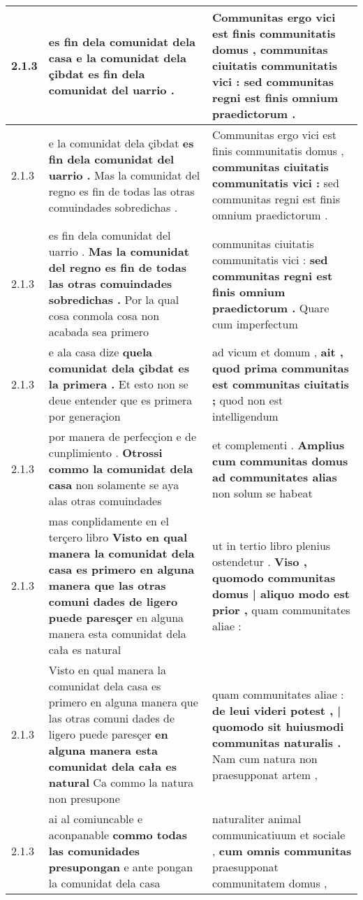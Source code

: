\begin{tabular}{|p{1cm}|p{6.5cm}|p{6.5cm}|}
2.1.3 & es fin dela comunidat dela casa \textbf{ e la comunidat dela çibdat } es fin dela comunidat del uarrio . & Communitas ergo vici est finis communitatis domus , \textbf{ communitas ciuitatis communitatis vici : } sed communitas regni est finis omnium praedictorum . \\\hline
2.1.3 & e la comunidat dela çibdat \textbf{ es fin dela comunidat del uarrio . } Mas la comunidat del regno es fin de todas las otras comuindades sobredichas . & Communitas ergo vici est finis communitatis domus , \textbf{ communitas ciuitatis communitatis vici : } sed communitas regni est finis omnium praedictorum . \\\hline
2.1.3 & es fin dela comunidat del uarrio . \textbf{ Mas la comunidat del regno es fin de todas las otras comuindades sobredichas . } Por la qual cosa conmola cosa non acabada sea primero & communitas ciuitatis communitatis vici : \textbf{ sed communitas regni est finis omnium praedictorum . } Quare cum imperfectum \\\hline
2.1.3 & e ala casa dize \textbf{ quela comunidat dela çibdat es la primera . } Et esto non se deue entender que es primera por generaçion & ad vicum et domum , \textbf{ ait , quod prima communitas est communitas ciuitatis ; } quod non est intelligendum \\\hline
2.1.3 & por manera de perfecçion e de cunplimiento . \textbf{ Otrossi commo la comunidat dela casa } non solamente se aya alas otras comuindades & et complementi . \textbf{ Amplius cum communitas domus ad communitates alias } non solum se habeat \\\hline
2.1.3 & mas conplidamente en el terçero libro \textbf{ Visto en qual manera la comunidat dela casa es primero en alguna manera que las otras comuni dades de ligero puede paresçer } en alguna manera esta comunidat dela cała es natural & ut in tertio libro plenius ostendetur . \textbf{ Viso , quomodo communitas domus | aliquo modo est prior , } quam communitates aliae : \\\hline
2.1.3 & Visto en qual manera la comunidat dela casa es primero en alguna manera que las otras comuni dades de ligero puede paresçer \textbf{ en alguna manera esta comunidat dela cała es natural } Ca commo la natura non presupone & quam communitates aliae : \textbf{ de leui videri potest , | quomodo sit huiusmodi communitas naturalis . } Nam cum natura non praesupponat artem , \\\hline
2.1.3 & ai al comiuncable e aconpanable \textbf{ commo todas las comunidades presupongan } e ante pongan la comunidat dela casa & naturaliter animal communicatiuum et sociale , \textbf{ cum omnis communitas } praesupponat communitatem domus , \\\hline

\end{tabular}
